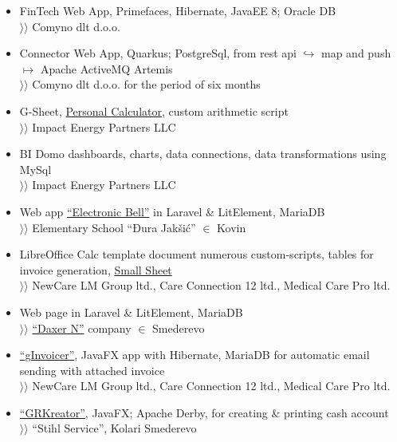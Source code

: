 \documentclass[12pt]{article}
\begin{document}
\begin{itemize}[parsep=1.5pt]
\item  FinTech Web App, Primefaces, Hibernate, JavaEE 8; Oracle DB \\
$\rangle\!\rangle$ Comyno dlt d.o.o.
\item Connector Web App, Quarkus; PostgreSql, from rest api $\hookrightarrow$ map and push $\mapsto$ Apache ActiveMQ Artemis \\
$\rangle\!\rangle$ Comyno dlt d.o.o. for the period of six months
\item G-Sheet, \href{https://docs.google.com/spreadsheets/d/1ztJoonmA0d0AyNDwVE1vnjpOPPpM03JF1eWCHwfQ4ZA/edit?usp=sharing}{Personal Calculator}, custom arithmetic script \\
$\rangle\!\rangle$ Impact Energy Partners LLC
\item BI Domo dashboards, charts, data connections, data transformations using MySql \\
$\rangle\!\rangle$ Impact Energy Partners LLC
\item Web app \href{https://zvono.nastavnikinformatike.com}{``Electronic Bell''} in Laravel \& LitElement, MariaDB \\
$\rangle\!\rangle$ Elementary School ``Đura Jakšić'' $\in$ Kovin
\item LibreOffice Calc template document numerous custom-scripts, tables for invoice generation, \href{https://docs.google.com/spreadsheets/d/1Hh9O7KoN8RETCPzJl5zVYV3CQdjvu2Qtbiu3tu5O9LY/edit?usp=sharing}{Small Sheet} \\ 
$\rangle\!\rangle$ NewCare LM Group ltd., Care Connection 12 ltd., Medical Care Pro ltd.
\item Web page in Laravel \& LitElement, MariaDB \\
$\rangle\!\rangle$ \href{https://www.daxern.rs}{``Daxer N''} company $\in$ Smederevo
\item \href{https://github.com/goranrsbg/gInvoicer}{``gInvoicer''}, JavaFX app with Hibernate, MariaDB for automatic email sending with attached invoice \\
$\rangle\!\rangle$ NewCare LM Group ltd., Care Connection 12 ltd., Medical Care Pro ltd.
\item \href{https://github.com/goranrsbg/GRKreator}{``GRKreator''}, JavaFX; Apache Derby, for creating \& printing cash account \\
$\rangle\!\rangle$ ``Stihl Service'', Kolari Smederevo
\end{itemize}
\end{document}
